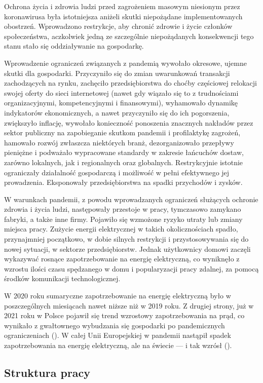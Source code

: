 \documentclass[polish, twoside, 12pt, a4paper]{article}
\theoremstyle{definition}
\theoremstyle{plain}
\theoremstyle{remark}
\begin{document}
Ochrona życia i zdrowia ludzi przed zagrożeniem masowym niesionym przez koronawirusa była istotniejsza aniżeli skutki niepożądane implementowanych obostrzeń. Wprowadzono restrykcje, aby chronić zdrowie i życie członków społeczeństwa, aczkolwiek jedną ze szczególnie niepożądanych konsekwencji tego stanu stało się oddziaływanie na gospodarkę.  

Wprowadzenie ograniczeń związanych z pandemią wywołało okresowe, ujemne skutki dla gospodarki. Przyczyniło się do zmian uwarunkowań transakcji zachodzących na rynku, zachęciło przedsiębiorstwa do choćby częściowej relokacji swojej oferty do sieci internetowej (nawet gdy wiązało się to z trudnościami organizacyjnymi, kompetencyjnymi i finansowymi), wyhamowało dynamikę indykatorów ekonomicznych, a nawet przyczyniło się do ich pogorszenia, zwiększyło inflację, wywołało konieczność ponoszenia znacznych nakładów przez sektor publiczny na zapobieganie skutkom pandemii i profilaktykę zagrożeń, hamowało rozwój zwłaszcza niektórych branż, dezorganizowało przepływy pieniężne i podważało wypracowane standardy w zakresie łańcuchów dostaw, zarówno lokalnych, jak i regionalnych oraz globalnych. Restrykcyjnie istotnie ograniczały działalność gospodarczą i możliwość w pełni efektywnego jej prowadzenia. Eksponowały przedsiębiorstwa na spadki przychodów i zysków. 

W warunkach pandemii, z powodu wprowadzanych ograniczeń służących ochronie zdrowia i życia ludzi, następowały przestoje w pracy, tymczasowo zamykano fabryki, a także inne firmy. Pojawiło się wzmożone ryzyko utraty lub zmiany miejsca pracy. Zużycie energii elektrycznej w takich okolicznościach spadło, przynajmniej początkowo, w dobie silnych restrykcji i przystosowywania się do nowej sytuacji, w sektorze przedsiębiorstw. Jednak użytkownicy domowi zaczęli wykazywać rosnące zapotrzebowanie na energię elektryczną, co wyniknęło z wzrostu ilości czasu spędzanego w domu i popularyzacji pracy zdalnej, za pomocą środków komunikacji technologicznej. 

W 2020 roku sumaryczne zapotrzebowanie na energię elektryczną było w poszczególnych miesiącach nawet niższe niż w 2019 roku. Z drugiej strony, już w 2021 roku w Polsce pojawił się trend wzrostowy zapotrzebowania na prąd, co wynikało z gwałtownego wybudzania się gospodarki po pandemicznych ograniczeniach (\cite{smyk2021}). W całej Unii Europejskiej w pandemii nastąpił spadek zapotrzebowania na energię elektryczną, ale na świecie --- i tak wzrósł (\cite{maciuch2023}). 

\subsection{Struktura pracy}
\end{document}
